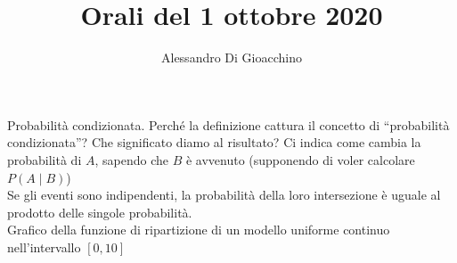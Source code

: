 \documentclass{article}
\title{Orali del 1 ottobre 2020}
\author{Alessandro Di Gioacchino}
\begin{document}
    \maketitle
    
    Probabilità condizionata. Perché la definizione cattura il concetto di “probabilità condizionata”? Che significato diamo al risultato? Ci indica come cambia la probabilità di
    $ A $, sapendo che $ B $ è avvenuto (supponendo di voler calcolare $ P ( A \mid B ) $) \\
    Se gli eventi sono indipendenti, la probabilità della loro intersezione è uguale al prodotto delle singole probabilità. \\
    Grafico della funzione di ripartizione di un modello uniforme continuo nell'intervallo $ [ 0, 10 ] $ \\
    
\end{document}
